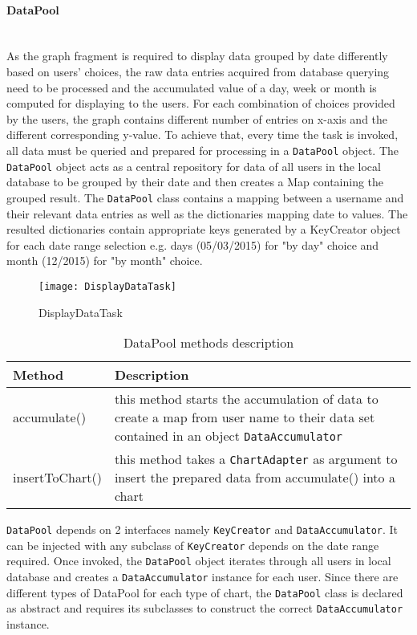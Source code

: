 \paragraph{DataPool}\mbox{} \\
As the graph fragment is required to display data grouped by date differently based on users' choices, the raw data
entries acquired from database querying need to be processed and the accumulated value of a day, week or month is
computed for displaying to the users. For each combination of choices provided by the users, the graph contains
different number of entries on x-axis and the different corresponding y-value. To achieve that, every time the task is
invoked, all data must be queried and prepared for processing in a \texttt{DataPool} object. The \texttt{DataPool}
object acts as a central repository for data of all users in the local database to be grouped by their date and then
creates a Map containing the grouped result. The \texttt{DataPool} class contains a mapping between a username and their
relevant data entries as well as the dictionaries mapping date to values. The resulted dictionaries contain appropriate
keys generated by a KeyCreator object for each date range selection e.g. days (05/03/2015) for "by day" choice and month
(12/2015) for "by month" choice.

\begin{figure}[!ht]
    \caption{DisplayDataTask}
    \centering
    \texttt{[image: DisplayDataTask]}
\end{figure}

\begin{table}
\begin{center}
    \begin{tabularx}{\textwidth}{| l | X |}
        \hline Method & Description \\
        \hline accumulate() & 
            this method starts the accumulation of data to create a map from user name to their data set contained in an
            object \texttt{DataAccumulator} \\
        \hline insertToChart() &
            this method takes a \texttt{ChartAdapter} as argument to insert the prepared data from accumulate() into a
            chart \\
        \hline
    \end{tabularx}
\end{center}
\caption{DataPool methods description}
\end{table}
\noindent \texttt{DataPool} depends on 2 interfaces namely \texttt{KeyCreator} and \texttt{DataAccumulator}. It can be
injected with any subclass of \texttt{KeyCreator} depends on the date range required.  Once invoked, the
\texttt{DataPool} object iterates through all users in local database and creates a \texttt{DataAccumulator} instance
for each user. Since there are different types of DataPool for each type of chart, the \texttt{DataPool} class is
declared as abstract and requires its subclasses to construct the correct \texttt{DataAccumulator} instance. 

